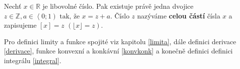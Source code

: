 \begin{definition}
  Nechť $x \in \mathbb{R}$ je libovolné číslo. Pak existuje právě jedna dvojice $z \in \mathbb{Z}, a \in \left \langle 0;1 \right) \text{ tak, že } x = z + a$.
Číslo $z$ nazýváme \textbf{celou částí} čísla $x$ a zapisujeme $[x] = z$ $(\lfloor x \rfloor = z)$.
\end{definition}

\begin{pozn}
    Pro definici limity a funkce spojité viz kapitolu \ref{limita},
    dále definici derivace \ref{derivace}, funkce konvexní a
    konkávní \ref{konvkonk} a konečně definici definici integrálu \ref{integral}.
\end{pozn}
